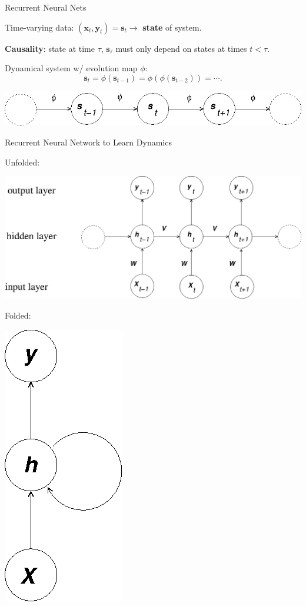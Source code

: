 \documentclass[12pt,t]{beamer}
\begin{document}
\begin{frame}{Recurrent Neural Nets}

Time-varying data: $ (\mathbf{x}_t, \mathbf{y}_t)  = \mathbf{s}_t \longrightarrow$ {\bf state} of system.

\bigskip

{\bf Causality}: state at time $\tau$, $\mathbf{s}_\tau$ must only depend on states at times $t<\tau$.

\bigskip

Dynamical system w/ evolution map $\phi$:
$$  \mathbf{s}_t = \phi( \mathbf{s}_{t-1}) = \phi(\phi( \mathbf{s}_{t-2})) = \cdots.$$

 \centerline{
\includegraphics[height=0.1\textheight]{./images/dynsys.png} 
}

\end{frame}

\begin{frame}{Recurrent Neural Network to Learn Dynamics}

\bigskip
Unfolded:
 \centerline{
\includegraphics[height=0.45\textheight]{./images/unfolded-rnn.png} 
}

\bigskip
Folded:
 \centerline{
\includegraphics[height=0.25\textheight]{./images/folded-rnn.png} 
}

\end{frame}
\end{document}
